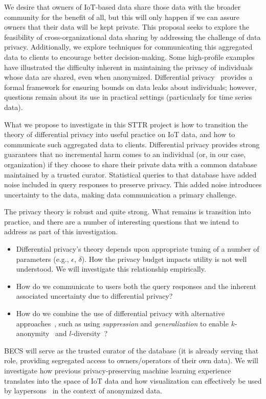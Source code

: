 We desire that owners of IoT-based data share those data with the broader community for the benefit of all, but this will only happen if we can assure owners that their data will be kept private.
This proposal seeks to explore the feasibility of cross-organizational
data sharing by addressing the challenge of data privacy.
Additionally, we explore techniques for communicating this aggregated data to clients to encourage better decision-making.  Some high-profile examples~\cite{bz06,bk07} have illustrated the difficulty inherent in maintaining the privacy of individuals whose data are shared, even when anonymized.
Differential privacy~\cite{dwork11,dr14} provides a formal framework for ensuring bounds on data leaks about individuals; however, questions remain about its use in practical settings (particularly for time series data).

What we propose to investigate in this STTR project is how to transition
the theory of differential privacy into useful practice on IoT data, and how to communicate such aggregated data to clients.  
Differential privacy provides strong guarantees that no incremental harm comes to an individual (or, in our case, organization) if they choose to share their private data with a common database maintained by a trusted curator. Statistical queries to that database have added noise included in query responses to preserve privacy.
This added noise introduces uncertainty to the data, making data communication a primary challenge. 

The privacy theory is robust and quite strong.  What remains is transition into
practice, and there are a number of interesting questions that we intend
to address as part of this investigation.
\begin{itemize}
\item Differential privacy's theory depends upon appropriate tuning of a number
of parameters (e.g., $\epsilon$, $\delta$).  How the privacy budget impacts
utility is not well understood.  We will investigate this relationship empirically.
\item How do we communicate to users both the query responses and the
inherent associated uncertainty due to differential privacy?
\item How do we combine the use of differential privacy with alternative
approaches~\cite{ct13}, such as using \emph{suppression} and
\emph{generalization} to enable $k$-anonymity~\cite{samarati01,sweeney02} and
$l$-diversity~\cite{mkgv07}?
\end{itemize}
BECS will serve as the trusted curator of the database (it is already serving
that role, providing segregated access to owners/operators of their own data).
We will investigate how previous privacy-preserving machine learning
experience~\cite{acgmmtz16,ss15} translates into the space of IoT data
and how visualization can effectively be used by
laypersons~\cite{ottley2012visually} in the context of anonymized data.

